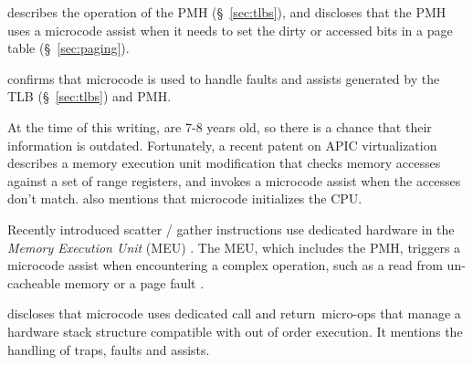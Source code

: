 




\cite{intel1997pmh} describes the operation of the PMH (\S~\ref{sec:tlbs}), and
discloses that the PMH uses a microcode assist when it needs to set the dirty
or accessed bits in a page table (\S~\ref{sec:paging}).

\cite{intel1996dtlb} confirms that microcode is used to handle faults and
assists generated by the TLB (\S~\ref{sec:tlbs}) and PMH.

At the time of this writing, \cite{intel1997events, intel1999exceptions,
intel1997pmh, intel1999events, intel1996dtlb} are 7-8 years old, so there is a
chance that their information is outdated. Fortunately, a recent patent on APIC
virtualization \cite{intel2014vapic} describes a memory execution unit
modification that checks memory accesses against a set of range registers, and
invokes a microcode assist when the accesses don't match.
\cite{intel2014vapic} also mentions that microcode initializes the CPU.



Recently introduced scatter / gather instructions use dedicated hardware in the
\textit{Memory Execution Unit} (MEU) \cite{intel2013scattergather,
intel2014gather}. The MEU, which includes the PMH, triggers a microcode assist
when encountering a complex operation, such as a read from un-cacheable memory
or a page fault \cite{intel2014gather}.

\cite{intel2007microstack} discloses that microcode uses dedicated call and
return micro-ops that manage a hardware stack structure compatible with out of
order execution. It mentions the handling of traps, faults and assists.

